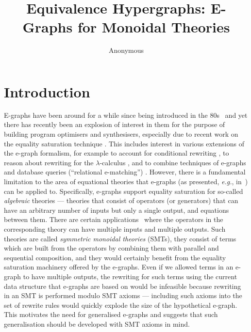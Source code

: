 \documentclass[sigconf, 9pt, nonacm]{acmart}
\theoremstyle{definition}
\begin{document}
\title{Equivalence Hypergraphs: E-Graphs for Monoidal Theories}

\author{Anonymous}

\maketitle

\section{Introduction}

E-graphs have been around for a while since being introduced in the 80s~\cite{nelson1980techniques} and yet there has recently been an explosion of interest in them for the purpose of building program optimisers and synthesisers, especially due to recent work on the equality saturation technique \cite{10.1145/1594834.1480915, griggio_proceedings_2022, EggPaper,flatt_small_2022}.
This includes interest in various extensions of the e-graph formalism, for example to account for conditional rewriting \cite{singher2023colored},  to reason about rewriting for the $\lambda$-calculus \cite{koehler2022sketchguided},  and to combine techniques of e-graphs and database queries (``relational e-matching'') \cite{zhang_relational_2022}.
However, there is a fundamental limitation to the area of equational theories that e-graphs (as presented, \textit{e.g.}, in~\cite{EggPaper}) can be applied to.
Specifically, e-graphs support equality saturation for so-called \textit{algebraic} theories --- theories that consist of operators (or generators) that can have an arbitrary number of inputs but only a single output, and equations between them.
There are certain applications~\cite{zx, ghica_compositional_2023, probabilistic} where the operators in the corresponding theory can have multiple inputs and multiple outputs. 
Such theories are called \textit{symmetric monoidal theories} (SMTs), they consist of terms which are built from the operators by combining them with parallel and sequential composition, and they would certainly benefit from the equality saturation machinery offered by the e-graphs.
Even if we allowed terms in an e-graph to have multiple outputs, the rewriting for such terms using the current data structure that e-graphs are based on would be infeasible because rewriting in an SMT is performed modulo SMT axioms --- including such axioms into the set of rewrite rules would quickly explode the size of the hypothetical e-graph.
This motivates the need for generalised e-graphs and suggests that such generalisation should be developed with SMT axioms in mind.
\end{document}
